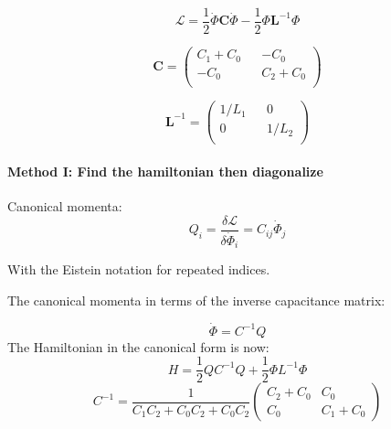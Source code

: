 \documentclass[12pt]{article}
\numberwithin{equation}{subsection}
\begin{document}
\begin{equation}
\mathcal{L} = \frac{1}{2}\dot \Phi \mathbf C\dot \Phi - \frac{1}{2}\Phi \mathbf L^{-1}\Phi 
\end{equation}

\begin{equation}
\mathbf C = \begin{pmatrix}
C_1+C_0 && -C_0 \\
-C_0 && C_2+C_0 \\
\end{pmatrix}
\end{equation}

\begin{equation}
\mathbf L^{-1} =
\begin{pmatrix}
1/L_1&& 0 \\
0 && 1/L_2\\
\end{pmatrix}
\end{equation}

\paragraph{Method I: Find the hamiltonian then diagonalize \\}

Canonical momenta:
\begin{equation}
    Q_i = \frac{\delta \mathcal L}{\delta \dot \Phi _i} = C_{ij} \dot \Phi_j
\end{equation}

With the Eistein notation for repeated indices.

The canonical momenta in terms of the inverse capacitance matrix:

\begin{equation}
    \dot \Phi = C^{-1} Q
\end{equation}
The Hamiltonian in the canonical form is now:
\begin{equation}
    H = \frac{1}{2} Q C^{-1} Q + \frac{1}{2} \Phi L^{-1} \Phi 
\end{equation}
\begin{equation}
    C^{-1} = \frac{1}{C_1C_2+C_0C_2+C_0C_2}
    \begin{pmatrix}
    C_2+C_0 & C_0\\
    C_0 & C_1+C_0
    \end{pmatrix}
    
\end{equation}
\end{document}
